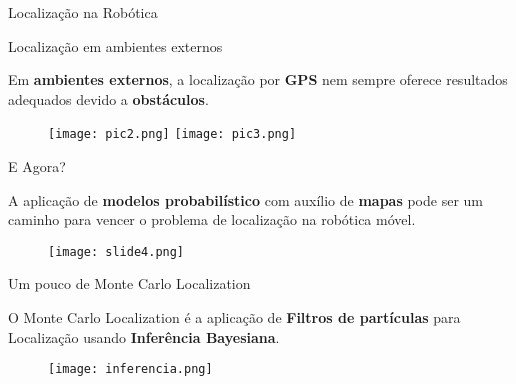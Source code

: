 {
\begin{frame}[t]\color{orange}\Huge{Localização na Robótica}

\end{frame}
}


\begin{frame}[t]{Localização em ambientes externos}

    Em \textbf{ambientes externos}, a localização por \textbf{GPS} nem sempre oferece resultados adequados devido a \textbf{obstáculos}.
    \begin{figure}

        \texttt{[image: pic2.png]}%
        \hfill
        \texttt{[image: pic3.png]}
    
    \end{figure}

\end{frame}


\begin{frame}[t]{E Agora?}

   A aplicação de \textbf{modelos probabilístico} com auxílio de \textbf{mapas} pode ser um caminho para vencer o problema de localização na robótica móvel.
   \begin{figure}
    \vspace*{0.5cm}
    \texttt{[image: slide4.png]}%
   \end{figure}




\end{frame}


\begin{frame}[t]{Um pouco de Monte Carlo Localization}

    O Monte Carlo Localization é a aplicação de \textbf{Filtros de partículas} para Localização usando  \textbf{Inferência Bayesiana}.
    
    \begin{figure}
       
        \vspace*{0.2cm}
        \texttt{[image: inferencia.png]}%
        
    
    \end{figure}
\end{frame}

